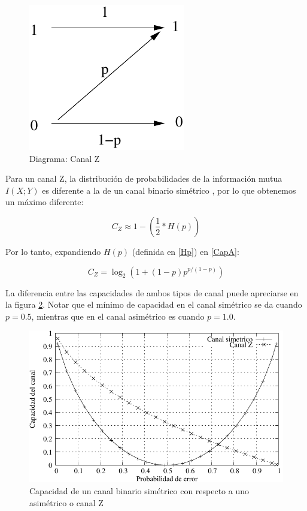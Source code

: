 \begin{figure}[th]
  \begin{center}
    \includegraphics[scale=0.5]{graphs/zchannel}
  \end{center}
  \caption{Diagrama: Canal Z}
  \label{fig:Gal}
\end{figure}

Para un canal Z, la distribución de probabilidades de la información mutua $I(X;Y)$ es diferente a la de un canal binario simétrico \cite{Tallini:02}, por lo que obtenemos un máximo diferente:

\begin{equation}\label{CapA}
C_{Z} \approx 1 - \left(\frac{1}{2}*H(p)\right)
\end{equation}

Por lo tanto, expandiendo $H(p)$ (definida en \ref{Hp}) en \ref{CapA}:

$$ C_{Z} = \log_2\left(1+(1-p) p^{p/(1-p)}\right) $$

La diferencia entre las capacidades de ambos tipos de canal puede apreciarse en la figura \ref{fig:CompBZ}. Notar que el mínimo de capacidad en el canal simétrico se da cuando $p=0.5$, mientras que en el canal asimétrico es cuando $p=1.0$.

\begin{figure}[th]
  \begin{center}
    \includegraphics[scale=0.9]{graphs/grafico_comparacion_capacidad_binaria_z}
  \end{center}
  \caption{Capacidad de un canal binario simétrico con respecto a uno asimétrico o canal Z}
  \label{fig:CompBZ}
\end{figure}


